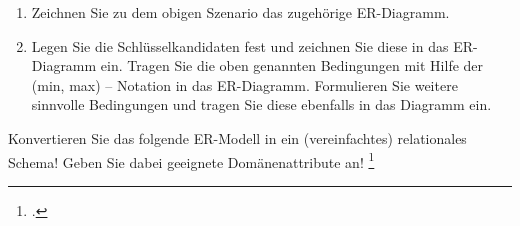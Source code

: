 \documentclass{bschlangaul-aufgabe}
\begin{document}
\begin{enumerate}
\item Zeichnen Sie zu dem obigen Szenario das zugehörige ER-Diagramm.

\item Legen Sie die Schlüsselkandidaten fest und zeichnen Sie diese in
das ER-Diagramm ein. Tragen Sie die oben genannten Bedingungen mit Hilfe
der (min, max) – Notation in das ER-Diagramm. Formulieren Sie weitere
sinnvolle Bedingungen und tragen Sie diese ebenfalls in das Diagramm
ein.
\end{enumerate}

Konvertieren Sie das folgende ER-Modell in ein (vereinfachtes)
relationales Schema! Geben Sie dabei geeignete
Domänenattribute an!
\footcite[Aufgabe 5: Fertigungsdatenbank die Zweite (Fortsetzung Staatsexamen Herbst 1997)]{db:ab:7}
\end{document}
